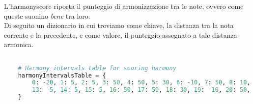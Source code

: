 \documentclass[a4paper,12pt]{report}
\begin{document}
L'harmonyscore riporta il punteggio di armonizzazione tra le note, ovvero come queste suonino \textit{bene} tra loro. \\
Di seguito un dizionario in cui troviamo come chiave, la distanza tra la nota corrente e la precedente, e come valore, il punteggio assegnato a tale distanza armonica.

\begin{lstlisting}[language=Python]

    # Harmony intervals table for scoring harmony
    harmonyIntervalsTable = {
        0: -20, 1: 5, 2: 5, 3: 50, 4: 50, 5: 30, 6: -10, 7: 50, 8: 10, 9: 40, 10: -2, 11: -2, 12: 10,
        13: -5, 14: 5, 15: 5, 16: 50, 17: 50, 18: 30, 19: -10, 20: 50, 21: 10, 22: 40, 23: -2, 24: -2, 25: 10
    }

\end{lstlisting}
\end{document}
